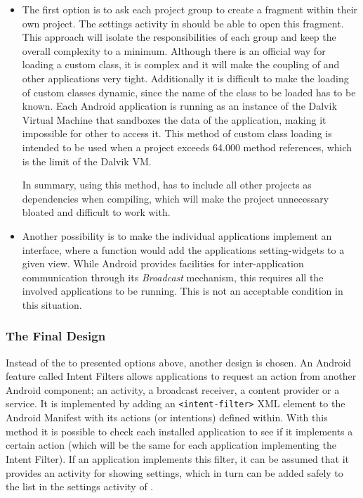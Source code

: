 \begin{itemize}
\item 
The first option is to ask each project group to create a fragment within their own project. 
The settings activity in \launcher should be able to open this fragment.
This approach will isolate the responsibilities of each group and keep the overall complexity to a minimum.
Although there is an official way for loading a custom class\cite{customClassLoading}, it is complex and it will make the coupling of \launcher and other applications very tight.
Additionally it is difficult to make the loading of custom classes dynamic, since the name of the class to be loaded has to be known.
Each Android application is running as an instance of the Dalvik Virtual Machine that sandboxes the data of the application, making it impossible for other to access it.
This method of custom class loading is intended to be used when a project exceeds 64.000 method references, which is the limit of the Dalvik VM.

In summary, using this method, \launcher has to include all other projects as dependencies when compiling, which will make the \launcher project unnecessary bloated and difficult to work with.

\item
Another possibility is to make the individual applications implement an interface, where a function would add the applications setting-widgets to a given view.
While Android provides facilities for inter-application communication through its \textit{Broadcast} mechanism\cite{broadcastReceiver}, this requires all the involved applications to be running.
This is not an acceptable condition in this situation. 
\end{itemize}
 
\subsubsection{The Final Design}
Instead of the to presented options above, another design is chosen.
An Android feature called Intent Filters allows applications to request an action from another Android component; an activity, a broadcast receiver, a content provider or a service.
It is implemented by adding an \lstinline|<intent-filter>| XML element to the Android Manifest with its actions (or intentions) defined within.\cite{intentFilter}
With this method it is possible to check each installed application to see if it implements a certain action (which will be the same for each \giraf application implementing the Intent Filter).
If an application implements this filter, it can be assumed that it provides an activity for showing settings, which in turn can be added safely to the list in the settings activity of \launcher.

